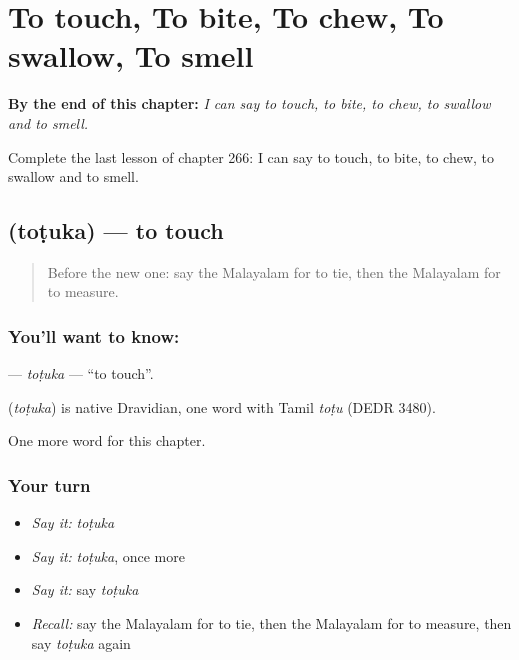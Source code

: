 
\chapter{To touch, To bite, To chew, To swallow, To smell}
\label{ch:ml-to-touch-to-bite-to-chew-to-swallow-to-smell}

\begin{chapteropening}
\textbf{By the end of this chapter:} \emph{I can say to touch, to bite, to chew, to swallow and to smell.}

Complete the last lesson of chapter 266: I can say to touch, to bite, to chew, to swallow and to smell.
\end{chapteropening}

\section[\texorpdfstring{\ml{തൊടുക} (toṭuka)}{തൊടുക (toṭuka)}]{ (toṭuka) — to touch}

\label{lesson:ML-C266-totuka}



\begin{quote}
Before the new one: say the Malayalam for to tie, then the Malayalam for to measure.
\end{quote}

\subsection*{You'll want to know: }
\textbf{} — \emph{toṭuka} — \textquotedblleft{}to touch\textquotedblright{}.

\begin{cousinweb}
\textbf{} (\emph{toṭuka}) is native Dravidian, one word with Tamil \emph{toṭu} (DEDR 3480).
\end{cousinweb}

\begin{grammarlens}[title={What you've built}]
One more word for this chapter.
\end{grammarlens}

\subsection*{Your turn}
\begin{itemize}
\raggedright
  \item \emph{Say it:} \emph{toṭuka}
  \item \emph{Say it:} \emph{toṭuka}, once more
  \item \emph{Say it:} say \emph{toṭuka}
  \item \emph{Recall:} say the Malayalam for to tie, then the Malayalam for to measure, then say \emph{toṭuka} again
\end{itemize}

